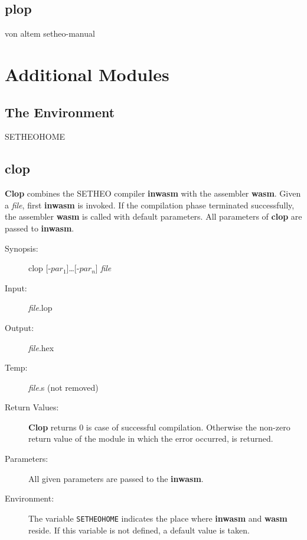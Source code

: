 \section{plop}\label{sec:plop}   %
von altem setheo-manual


\chapter{Additional Modules}
\section{The Environment}

SETHEOHOME

\section{clop}
{\bf Clop} combines the SETHEO compiler {\bf inwasm} with the
assembler {\bf wasm}. Given a {\em file\/}, first {\bf inwasm}
is invoked.
If the compilation phase terminated successfully, the
assembler {\bf wasm} is called with default parameters.
All parameters of {\bf clop} are passed to {\bf inwasm}.

\begin{description}
\item[Synopsis:]
clop [-$par_1$]\ldots[-$par_n$] {\em file}
\item[Input:] {\em file}.lop
\item[Output:] {\em file}.hex
\item[Temp:] {\em file}.s (not removed)
\item[Return Values:]
	{\bf Clop} returns $0$ is case of successful compilation.
	Otherwise the non-zero return value of the module in which
	the error occurred, is returned.
\item[Parameters:]
	All given parameters are passed to the {\bf inwasm}.
\item[Environment:]
	The variable {\tt SETHEOHOME} indicates the place where
	{\bf inwasm} and {\bf wasm} reside. If this variable is
	not defined, a default value is taken.
\end{description}

